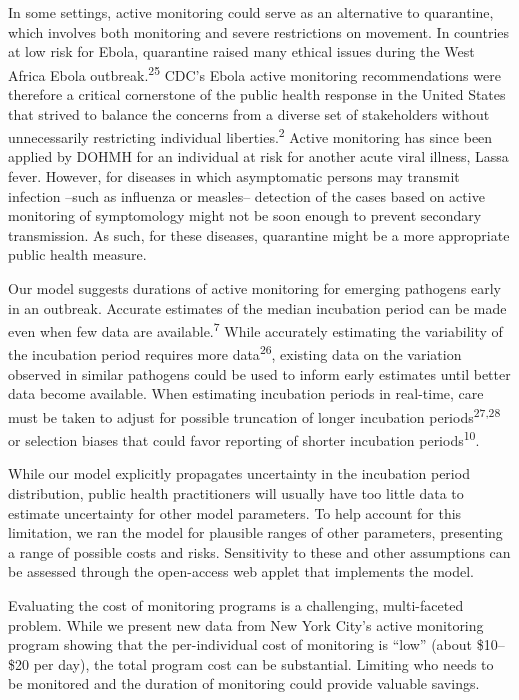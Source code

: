 \documentclass[]{article}
\begin{document}
In some settings, active monitoring could serve as an alternative to
quarantine, which involves both monitoring and severe restrictions on
movement. In countries at low risk for Ebola, quarantine raised many
ethical issues during the West Africa Ebola
outbreak.\textsuperscript{25} CDC's Ebola active monitoring
recommendations were therefore a critical cornerstone of the public
health response in the United States that strived to balance the
concerns from a diverse set of stakeholders without unnecessarily
restricting individual liberties.\textsuperscript{2} Active monitoring
has since been applied by DOHMH for an individual at risk for another
acute viral illness, Lassa fever. However, for diseases in which
asymptomatic persons may transmit infection --such as influenza or
measles-- detection of the cases based on active monitoring of
symptomology might not be soon enough to prevent secondary transmission.
As such, for these diseases, quarantine might be a more appropriate
public health measure.

Our model suggests durations of active monitoring for emerging pathogens
early in an outbreak. Accurate estimates of the median incubation period
can be made even when few data are available.\textsuperscript{7} While
accurately estimating the variability of the incubation period requires
more data\textsuperscript{26}, existing data on the variation observed
in similar pathogens could be used to inform early estimates until
better data become available. When estimating incubation periods in
real-time, care must be taken to adjust for possible truncation of
longer incubation periods\textsuperscript{27,28} or selection biases
that could favor reporting of shorter incubation
periods\textsuperscript{10}.

While our model explicitly propagates uncertainty in the incubation
period distribution, public health practitioners will usually have too
little data to estimate uncertainty for other model parameters. To help
account for this limitation, we ran the model for plausible ranges of
other parameters, presenting a range of possible costs and risks.
Sensitivity to these and other assumptions can be assessed through the
open-access web applet that implements the model.

Evaluating the cost of monitoring programs is a challenging,
multi-faceted problem. While we present new data from New York City's
active monitoring program showing that the per-individual cost of
monitoring is ``low'' (about \$10--\$20 per day), the total program cost
can be substantial. Limiting who needs to be monitored and the duration
of monitoring could provide valuable savings.
\end{document}
